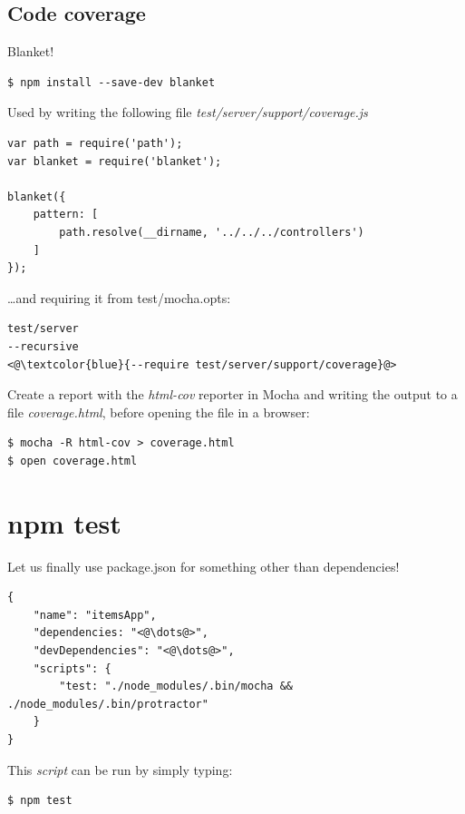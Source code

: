 \documentclass[british]{article}
\begin{document}
\subsection{Code coverage}
Blanket!

\begin{lstlisting}
$ npm install --save-dev blanket
\end{lstlisting}

Used by writing the following file \textit{test/server/support/coverage.js}

\begin{lstlisting}
var path = require('path');
var blanket = require('blanket');

blanket({
    pattern: [
        path.resolve(__dirname, '../../../controllers')
    ]
});
\end{lstlisting}

\dots and requiring it from test/mocha.opts:

\begin{lstlisting}
test/server
--recursive
<@\textcolor{blue}{--require test/server/support/coverage}@>
\end{lstlisting}

Create a report with the \textit{html-cov} reporter in Mocha and writing the output to a file \textit{coverage.html}, before opening the file in a browser:

\begin{lstlisting}
$ mocha -R html-cov > coverage.html
$ open coverage.html
\end{lstlisting}

\section{npm test}

Let us finally use package.json for something other than dependencies!

\begin{lstlisting}
{
    "name": "itemsApp",
    "dependencies: "<@\dots@>",
    "devDependencies": "<@\dots@>",
    "scripts": {
        "test: "./node_modules/.bin/mocha && ./node_modules/.bin/protractor"
    }
}
\end{lstlisting}

This \textit{script} can be run by simply typing:

\begin{lstlisting}
$ npm test    
\end{lstlisting}
\end{document}
